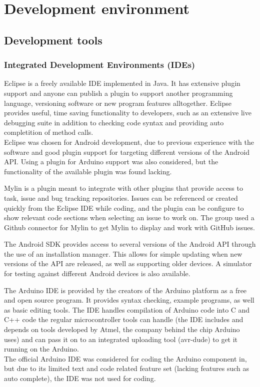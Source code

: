 \section{Development environment}
\subsection{Development tools}
\subsubsection{Integrated Development Environments (IDEs)}
Eclipse is a freely available IDE implemented in Java. It has extensive plugin support and anyone can publish a plugin to support another programming language, versioning software or new program features alltogether. Eclipse provides useful, time saving functionality to developers, such as an extensive live debugging suite in addition to checking code syntax and providing auto completition of method calls.\\
Eclipse was chosen for Android development, due to previous experience with the software and good plugin support for targeting different versions of the Android API. Using a plugin for Arduino support was also considered, but the functionality of the available plugin was found lacking. %

Mylin is a plugin meant to integrate with other plugins that provide access to task, issue and bug tracking repositories. Issues can be referenced or created quickly from the Eclipse IDE while coding, and the plugin can be configure to show relevant code sections when selecting an issue to work on. The group used a Github connector for Mylin to get Mylin to display and work with GitHub issues.

The Android SDK provides access to several versions of the Android API through the use of an installation manager. This allows for simple updating when new versions of the API are released, as well as supporting older devices. A simulator for testing against different Android devices is also available.

The Arduino IDE is provided by the creators of the Arduino platform as a free and open source program. It provides syntax checking, example programs, as well as basic editing tools. The IDE handles compilation of Arduino code into C and C++ code the regular microcontroller tools can handle (the IDE includes and depends on tools developed by Atmel, the company behind the chip Arduino uses) and can pass it on to an integrated uploading tool (avr-dude) to get it running on the Arduino.\\
The official Arduino IDE was considered for coding the Arduino component in, but due to its limited text and code related feature set (lacking features such as auto complete), the IDE was not used for coding.

